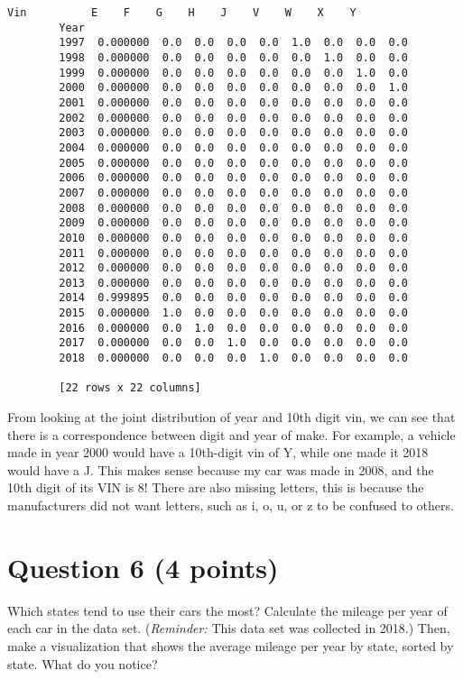 \documentclass[11pt]{article}
\begin{document}
\begin{Verbatim}[commandchars=\\\{\}]
        Vin          E    F    G    H    J    V    W    X    Y  
        Year                                                    
        1997  0.000000  0.0  0.0  0.0  0.0  1.0  0.0  0.0  0.0  
        1998  0.000000  0.0  0.0  0.0  0.0  0.0  1.0  0.0  0.0  
        1999  0.000000  0.0  0.0  0.0  0.0  0.0  0.0  1.0  0.0  
        2000  0.000000  0.0  0.0  0.0  0.0  0.0  0.0  0.0  1.0  
        2001  0.000000  0.0  0.0  0.0  0.0  0.0  0.0  0.0  0.0  
        2002  0.000000  0.0  0.0  0.0  0.0  0.0  0.0  0.0  0.0  
        2003  0.000000  0.0  0.0  0.0  0.0  0.0  0.0  0.0  0.0  
        2004  0.000000  0.0  0.0  0.0  0.0  0.0  0.0  0.0  0.0  
        2005  0.000000  0.0  0.0  0.0  0.0  0.0  0.0  0.0  0.0  
        2006  0.000000  0.0  0.0  0.0  0.0  0.0  0.0  0.0  0.0  
        2007  0.000000  0.0  0.0  0.0  0.0  0.0  0.0  0.0  0.0  
        2008  0.000000  0.0  0.0  0.0  0.0  0.0  0.0  0.0  0.0  
        2009  0.000000  0.0  0.0  0.0  0.0  0.0  0.0  0.0  0.0  
        2010  0.000000  0.0  0.0  0.0  0.0  0.0  0.0  0.0  0.0  
        2011  0.000000  0.0  0.0  0.0  0.0  0.0  0.0  0.0  0.0  
        2012  0.000000  0.0  0.0  0.0  0.0  0.0  0.0  0.0  0.0  
        2013  0.000000  0.0  0.0  0.0  0.0  0.0  0.0  0.0  0.0  
        2014  0.999895  0.0  0.0  0.0  0.0  0.0  0.0  0.0  0.0  
        2015  0.000000  1.0  0.0  0.0  0.0  0.0  0.0  0.0  0.0  
        2016  0.000000  0.0  1.0  0.0  0.0  0.0  0.0  0.0  0.0  
        2017  0.000000  0.0  0.0  1.0  0.0  0.0  0.0  0.0  0.0  
        2018  0.000000  0.0  0.0  0.0  1.0  0.0  0.0  0.0  0.0  
        
        [22 rows x 22 columns]
\end{Verbatim}
            
    From looking at the joint distribution of year and 10th digit vin, we
can see that there is a correspondence between digit and year of make.
For example, a vehicle made in year 2000 would have a 10th-digit vin of
Y, while one made it 2018 would have a J. This makes sense because my
car was made in 2008, and the 10th digit of its VIN is 8! There are also
missing letters, this is because the manufacturers did not want letters,
such as i, o, u, or z to be confused to others.

    \hypertarget{question-6-4-points}{%
\section{Question 6 (4 points)}\label{question-6-4-points}}

Which states tend to use their cars the most? Calculate the mileage per
year of each car in the data set. (\emph{Reminder:} This data set was
collected in 2018.) Then, make a visualization that shows the average
mileage per year by state, sorted by state. What do you notice?
\end{document}
